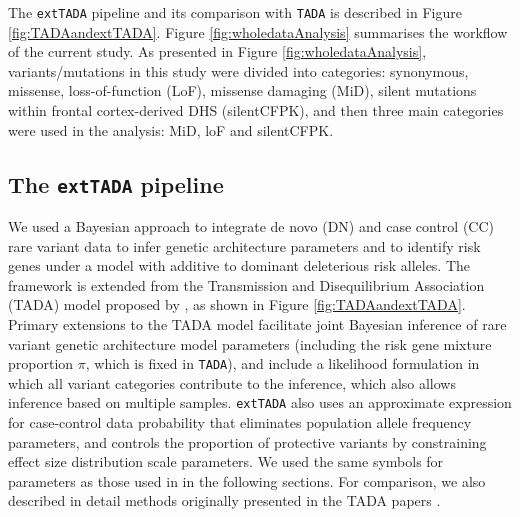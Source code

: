\documentclass[]{article}
\begin{document}
The \texttt{extTADA} pipeline and its comparison with \texttt{TADA} is described in Figure
\ref{fig:TADAandextTADA}. Figure \ref{fig:wholedataAnalysis} summarises the workflow of the current
study. As presented in Figure \ref{fig:wholedataAnalysis}, variants/mutations in this study were
divided into categories: synonymous, missense, loss-of-function (LoF), missense damaging (MiD),
silent mutations within frontal cortex-derived DHS (silentCFPK), and then three main categories were
used in the analysis: MiD, loF and silentCFPK.

\subsection{The \texttt{extTADA} pipeline}

We used a Bayesian approach to integrate de novo (DN) and case control (CC) rare variant data to
infer genetic architecture parameters and to identify risk genes under a model with additive to
dominant deleterious risk alleles. The framework is extended from the Transmission and
Disequilibrium Association (TADA) model proposed by \cite{he2013integrated, de2014synaptic}, as
shown in Figure \ref{fig:TADAandextTADA}. Primary extensions to the TADA model facilitate joint
Bayesian inference of rare variant genetic architecture model parameters (including the risk gene
mixture proportion $\pi$, which is fixed in \texttt{TADA}), and include a likelihood formulation in
which all variant categories contribute to the inference, which also allows inference based on
multiple samples. \texttt{extTADA} also uses an approximate expression for case-control data
probability that eliminates population allele frequency parameters, and controls the proportion of
protective variants by constraining effect size distribution scale parameters. We used the same
symbols for parameters as those used in \cite{he2013integrated, de2014synaptic} in the following
sections. For comparison, we also described in detail methods originally presented in the TADA
papers \citep{he2013integrated,de2014synaptic}.

\end{document}
